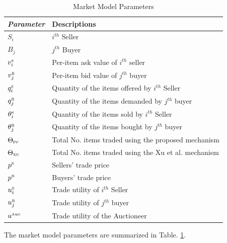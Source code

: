 \begin{table}
    \caption{Market Model Parameters}
    \label{tbl:params}
    \centering
      \begin{tabular}{>{\itshape}ll}
        \toprule
        \upshape Parameter & Descriptions\\\midrule
        $S_i$ & $i^{th}$ Seller\\
        \smallskip
        $B_j$ & $j^{th}$ Buyer\\
        \smallskip
        $v^{\textsc{s}}_{i}$ & Per-item ask value of $i^{th}$ seller\\
        \smallskip
        $v^{\textsc{b}}_{j}$ & Per-item bid value of $j^{th}$ buyer\\
        \smallskip
        $q^{\textsc{s}}_{i}$ & Quantity of the items offered by $i^{th}$ Seller\\
        \smallskip
        $q^{\textsc{b}}_{j}$ & Quantity of the items demanded by $j^{th}$ buyer\\
        \smallskip
        $\theta^{\textsc{s}}_{i}$ & Quantity of the items sold by $i^{th}$ Seller\\
        \smallskip
        $\theta^{\textsc{b}}_{j}$ & Quantity of the items bought by $j^{th}$ buyer\\
        \smallskip
        $\Theta_{\textsc{p}{\tiny r}}$ & Total No. items traded using the proposed mechanism\\
        \smallskip
        $\Theta_{\textsc{xu}}$ & Total No. items traded using the Xu et al. mechanism\\
        \smallskip
        $p^{\textsc{s}}$ & Sellers' trade price\\
        \smallskip
        $p^{\textsc{b}}$ & Buyers' trade price\\
        \smallskip
        $u^{\textsc{s}}_{i}$ & Trade utility of $i^{th}$ Seller\\
        \smallskip
        $u^{\textsc{b}}_{j}$ & Trade utility of $j^{th}$ buyer\\
        \smallskip
        $u^{\textsc{a}{\tiny uc}}$ & Trade utility of the Auctioneer\\\bottomrule
      \end{tabular}
      \vspace{-4mm}
  \end{table}

The market model parameters are summarized in Table. \ref{tbl:params}.




